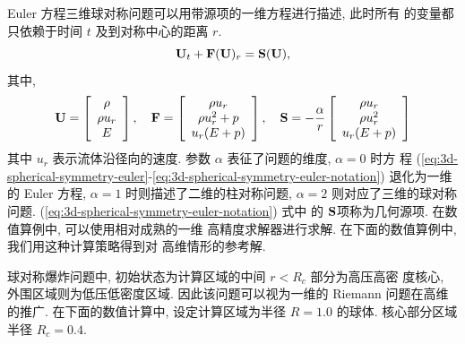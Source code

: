 Euler 方程三维球对称问题可以用带源项的一维方程进行描述, 此时所有
的变量都只依赖于时间 $t$ 及到对称中心的距离 $r$.
\begin{equation}
  \label{eq:3d-spherical-symmetry-euler}
  {\bf{U}}_{t} + {\bf{F}}({\bf{U}})_{r} = {\bf{S}} ({\bf{U}}),
\end{equation}
其中,
\begin{equation}
  \label{eq:3d-spherical-symmetry-euler-notation}
  {\bf{U}} = \left[
    \begin{array}{c}
      \rho \\
      \rho u_{r}\\
      E
    \end{array}
  \right], \quad
  {\bf{F}} = \left[
    \begin{array}{c}
      \rho u_{r}\\
      \rho u_{r}^{2} + p\\
      u_{r} (E + p)
    \end{array}
  \right], \quad
  {\bf{S}} = - \frac{\alpha}{r} \left[
    \begin{array}{c}
      \rho u_{r}\\
      \rho u_{r}^{2} \\
      u_{r} (E + p)
    \end{array}
  \right]
\end{equation}
其中 $u_{r}$ 表示流体沿径向的速度. 参数 $\alpha$ 表征了问题的维度,
$\alpha = 0$ 时方
程
(\ref{eq:3d-spherical-symmetry-euler}-\ref{eq:3d-spherical-symmetry-euler-notation})
退化为一维的 Euler 方程, $\alpha = 1$ 时则描述了二维的柱对称问题,
$\alpha = 2$ 则对应了三维的球对称问题.
(\ref{eq:3d-spherical-symmetry-euler-notation}) 式中
的 ${\bf{S}}$项称为几何源项. 在数值算例中, 可以使用相对成熟的一维
高精度求解器进行求解. 在下面的数值算例中, 我们用这种计算策略得到对
高维情形的参考解.

球对称爆炸问题中, 初始状态为计算区域的中间 $r < R_{c}$ 部分为高压高密
度核心, 外围区域则为低压低密度区域. 因此该问题可以视为一维的 Riemann
问题在高维的推广. 在下面的数值计算中, 设定计算区域为半径 $R =
1.0$ 的球体. 核心部分区域半径 $R_{c} = 0.4$.

